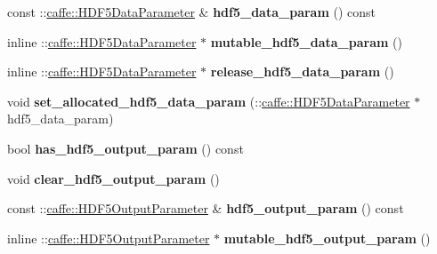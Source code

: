 \begin{DoxyCompactItemize}
const \+::\mbox{\hyperlink{classcaffe_1_1_h_d_f5_data_parameter}{caffe\+::\+H\+D\+F5\+Data\+Parameter}} \& {\bfseries hdf5\+\_\+data\+\_\+param} () const
\item 
\mbox{\label{classcaffe_1_1_v1_layer_parameter_a5a50f831c3756cdde24b6b242b3169a7}} 
inline \+::\mbox{\hyperlink{classcaffe_1_1_h_d_f5_data_parameter}{caffe\+::\+H\+D\+F5\+Data\+Parameter}} $\ast$ {\bfseries mutable\+\_\+hdf5\+\_\+data\+\_\+param} ()
\item 
\mbox{\label{classcaffe_1_1_v1_layer_parameter_ab99117afc80f1d3bfe603a7abcc0cace}} 
inline \+::\mbox{\hyperlink{classcaffe_1_1_h_d_f5_data_parameter}{caffe\+::\+H\+D\+F5\+Data\+Parameter}} $\ast$ {\bfseries release\+\_\+hdf5\+\_\+data\+\_\+param} ()
\item 
\mbox{\label{classcaffe_1_1_v1_layer_parameter_a462a890f0509f6681836f22999c7f5da}} 
void {\bfseries set\+\_\+allocated\+\_\+hdf5\+\_\+data\+\_\+param} (\+::\mbox{\hyperlink{classcaffe_1_1_h_d_f5_data_parameter}{caffe\+::\+H\+D\+F5\+Data\+Parameter}} $\ast$hdf5\+\_\+data\+\_\+param)
\item 
\mbox{\label{classcaffe_1_1_v1_layer_parameter_af9ef4f0b815a754541aae4cd2471688d}} 
bool {\bfseries has\+\_\+hdf5\+\_\+output\+\_\+param} () const
\item 
\mbox{\label{classcaffe_1_1_v1_layer_parameter_a348da83622fd178b6579385ea360dd37}} 
void {\bfseries clear\+\_\+hdf5\+\_\+output\+\_\+param} ()
\item 
\mbox{\label{classcaffe_1_1_v1_layer_parameter_a93aef0a194ad2ea806fd1f5f68fa9500}} 
const \+::\mbox{\hyperlink{classcaffe_1_1_h_d_f5_output_parameter}{caffe\+::\+H\+D\+F5\+Output\+Parameter}} \& {\bfseries hdf5\+\_\+output\+\_\+param} () const
\item 
\mbox{\label{classcaffe_1_1_v1_layer_parameter_aabac708b02965b0342dd1b4439be2fb7}} 
inline \+::\mbox{\hyperlink{classcaffe_1_1_h_d_f5_output_parameter}{caffe\+::\+H\+D\+F5\+Output\+Parameter}} $\ast$ {\bfseries mutable\+\_\+hdf5\+\_\+output\+\_\+param} ()

\end{DoxyCompactItemize}

